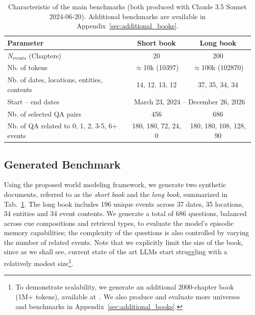 \documentclass{article}
\begin{document}
\begin{table}[t]
\centering
\begin{small}
\caption{Characteristic of the main benchmarks (both produced with Claude 3.5 Sonnet 2024-06-20). Additional benchmarks are available in Appendix~\ref{sec:additional_books}.}
\label{tab:world_model_params}
\begin{tabular}{lcc}
\toprule
\bf Parameter & \bf  Short book & \bf  Long book \\
\midrule
$N_\text{events}$ (Chapters) & 20 & 200 \\
Nb. of tokens & $\approx$10k (10397) & $\approx$100k (102870) \\
Nb. of dates, locations, entities, contents & 14, 12, 13, 12 & 37, 35, 34, 34 \\
Start -- end dates & \multicolumn{2}{c}{March 23, 2024 -- December 26, 2026} \\ \midrule
Nb. of selected QA pairs & 456 & 686 \\
Nb. of QA related to 0, 1, 2, 3-5, 6+ events & 180, 180, 72, 24, 0 & 180, 180, 108, 128, 90 \\ 
\bottomrule 
\end{tabular}
\end{small}
\end{table}

\subsection{Generated Benchmark}
Using the proposed world modeling framework, we generate two synthetic documents, referred to as the \textit{short book} and the \textit{long book}, summarized in Tab.~\ref{tab:world_model_params}. The long book includes 196 unique events across 37 dates, 35 locations, 34 entities and 34 event contents. We generate a total of 686 questions, balanced across cue compositions and retrieval types, to evaluate the model's episodic memory capabilities; the complexity of the questions is also controlled by varying the number of related events. Note that we explicitly limit the size of the book, since as we shall see, current state of the art LLMs start struggling with a relatively modest size\footnote{To demonstrate scalability, we generate an additional 2000-chapter book (1M+ tokens), available at~\cite{codeAvailability}. 
We also produce and evaluate more universes and benchmarks in Appendix~\ref{sec:additional_books}.}. %
\end{document}
